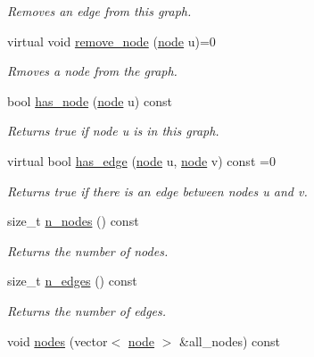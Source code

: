 \begin{DoxyCompactItemize}
\begin{DoxyCompactList}\small\item\em Removes an edge from this graph. \end{DoxyCompactList}\item 
virtual void \hyperlink{classlgraph_1_1utils_1_1xxgraph_a082e0000394dbf3b0bc5d3976baff593}{remove\+\_\+node} (\hyperlink{namespacelgraph_1_1utils_a7bd66ede3805ef121bc2835bd48de0cf}{node} u)=0
\begin{DoxyCompactList}\small\item\em Rmoves a node from the graph. \end{DoxyCompactList}\item 
bool \hyperlink{classlgraph_1_1utils_1_1xxgraph_a026ab064c2be26790cc1f547be2157c9}{has\+\_\+node} (\hyperlink{namespacelgraph_1_1utils_a7bd66ede3805ef121bc2835bd48de0cf}{node} u) const \hypertarget{classlgraph_1_1utils_1_1xxgraph_a026ab064c2be26790cc1f547be2157c9}{}\label{classlgraph_1_1utils_1_1xxgraph_a026ab064c2be26790cc1f547be2157c9}

\begin{DoxyCompactList}\small\item\em Returns true if node {\itshape u} is in this graph. \end{DoxyCompactList}\item 
virtual bool \hyperlink{classlgraph_1_1utils_1_1xxgraph_a9e94100afc70b09049432f196550407c}{has\+\_\+edge} (\hyperlink{namespacelgraph_1_1utils_a7bd66ede3805ef121bc2835bd48de0cf}{node} u, \hyperlink{namespacelgraph_1_1utils_a7bd66ede3805ef121bc2835bd48de0cf}{node} v) const =0
\begin{DoxyCompactList}\small\item\em Returns true if there is an edge between nodes {\itshape u} and {\itshape v}. \end{DoxyCompactList}\item 
size\+\_\+t \hyperlink{classlgraph_1_1utils_1_1xxgraph_ad345f1fbf1dee34e1579b5aea9aef9b2}{n\+\_\+nodes} () const 
\begin{DoxyCompactList}\small\item\em Returns the number of nodes. \end{DoxyCompactList}\item 
size\+\_\+t \hyperlink{classlgraph_1_1utils_1_1xxgraph_af3f7c3835406c2cbf70479ae1c0253c9}{n\+\_\+edges} () const 
\begin{DoxyCompactList}\small\item\em Returns the number of edges. \end{DoxyCompactList}\item 
void \hyperlink{classlgraph_1_1utils_1_1xxgraph_a99f83387aa9f59b861e675251be5a3ad}{nodes} (vector$<$ \hyperlink{namespacelgraph_1_1utils_a7bd66ede3805ef121bc2835bd48de0cf}{node} $>$ \&all\+\_\+nodes) const \hypertarget{classlgraph_1_1utils_1_1xxgraph_a99f83387aa9f59b861e675251be5a3ad}{}\label{classlgraph_1_1utils_1_1xxgraph_a99f83387aa9f59b861e675251be5a3ad}


\end{DoxyCompactItemize}
